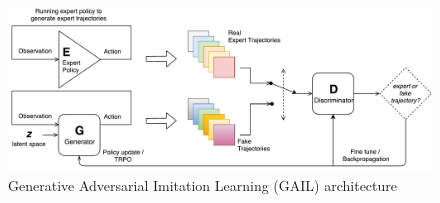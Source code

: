 \begin{figure}
\centering
\includegraphics[width=15cm]{Figures/GAIL-GAN}
\caption{Generative Adversarial Imitation Learning (GAIL) architecture}
\label{fig:GAIL-GAN}
\end{figure}


